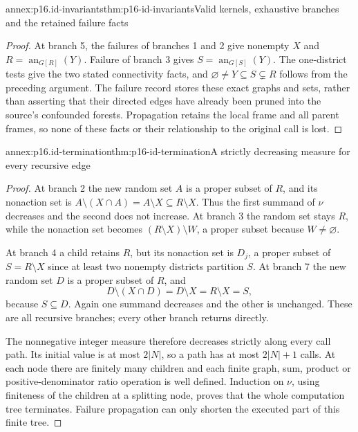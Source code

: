 \begin{annexitem}{annex:p16.id-invariants}{thm:p16-id-invariants}{Valid kernels, exhaustive branches and the retained failure facts}
\begin{proof}
At branch 5, the failures of branches 1 and 2 give nonempty \(X\)
and \(R=\operatorname{an}_{G[R]}(Y)\). Failure of branch 3
gives \(S=\operatorname{an}_{G[S]}(Y)\). The one-district
tests give the two stated connectivity facts, and
\(\varnothing\ne Y\subseteq S\subsetneq R\) follows from
the preceding argument. The failure record stores these exact graphs
and sets, rather than asserting that their directed edges have already
been pruned into the source's confounded forests. Propagation retains
the local frame and all parent frames, so none of these facts or
their relationship to the original call is lost.
\end{proof}
\end{annexitem}

\begin{annexitem}{annex:p16.id-termination}{thm:p16-id-termination}{A strictly decreasing measure for every recursive edge}
\begin{proof}
At branch 2 the new random set \(A\) is a proper subset of
\(R\), and its nonaction set is
\(A\setminus(X\cap A)=A\setminus X\subseteq R\setminus X\).
Thus the first summand of \(\nu\) decreases and the second
does not increase. At branch 3 the random set stays \(R\),
while the nonaction set becomes
\((R\setminus X)\setminus W\), a proper subset because
\(W\ne\varnothing\).

At branch 4 a child retains \(R\), but its nonaction set is
\(D_j\), a proper subset of \(S=R\setminus X\) since at
least two nonempty districts partition \(S\). At branch 7 the
new random set \(D\) is a proper subset of \(R\), and
\[
 D\setminus(X\cap D)=D\setminus X=R\setminus X=S,
\]
because \(S\subseteq D\). Again one summand decreases and
the other is unchanged. These are all recursive branches; every
other branch returns directly.

The nonnegative integer measure therefore decreases strictly along
every call path. Its initial value is at most \(2|N|\), so a
path has at most \(2|N|+1\) calls. At each node there are
finitely many children and each finite graph, sum, product or
positive-denominator ratio operation is well defined. Induction on
\(\nu\), using finiteness of the children at a splitting node,
proves that the whole computation tree terminates. Failure propagation
can only shorten the executed part of this finite tree.
\end{proof}
\end{annexitem}

